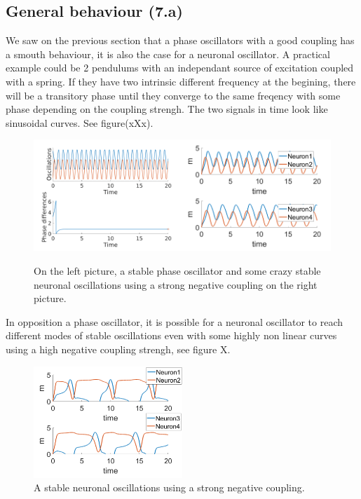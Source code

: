 \documentclass[a4paper]{scrartcl}
\begin{document}
\subsection{General behaviour (7.a)}

We saw  on the previous section that a phase oscillators with a good coupling has a smouth behaviour, it is also the case for a neuronal oscillator. A practical example could be 2 pendulums with an independant source of excitation coupled with a spring. If they have two intrinsic different frequency at the begining, there will be a transitory phase until they converge to the same freqency with some phase depending on the coupling strengh. The two signals in time look like sinusoidal curves. See figure(xXx).

\begin{figure}[!h]
	\centering
	\includegraphics[width=0.5\textwidth]{fig/2phase.png}\includegraphics[width=0.5\textwidth]{fig/neuron1}
	\caption{On the left picture, a stable phase oscillator and some crazy stable neuronal oscillations using a strong negative coupling on the right picture.}
\end{figure}

\newpage

In opposition a phase oscillator, it is possible for a neuronal oscillator to reach different modes of stable oscillations even with some highly non linear curves using a high negative coupling strengh, see figure X.

\begin{figure}[!h]
	\centering
	\includegraphics[width=0.5\textwidth]{fig/crazy.png}
	\caption{A stable neuronal oscillations using a strong negative coupling.}
\end{figure}
\end{document}
